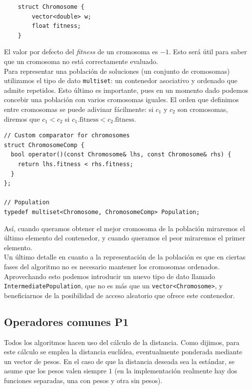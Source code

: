 \documentclass[12pt]{article}
\begin{document}
\begin{verbatim}
	struct Chromosome {
	    vector<double> w;
	    float fitness;
	}
\end{verbatim}

El valor por defecto del \textit{fitness} de un cromosoma es $-1$. Esto será útil para saber que un cromosoma no está correctamente evaluado.\\

Para representar una población de soluciones (un conjunto de cromosomas) utilizamos el tipo de dato \verb|multiset|: un contenedor asociativo y ordenado que admite repetidos. Esto último es importante, pues en un momento dado podemos concebir una población con varios cromosomas iguales. El orden que definimos entre cromosomas se puede adivinar fácilmente: si $c_1$ y $c_2$ son cromosomas, diremos que $c_1 < c_2$ si $c_1.\text{fitness} < c_2.\text{fitness}$.

\begin{verbatim}
// Custom comparator for chromosomes
struct ChromosomeComp {
  bool operator()(const Chromosome& lhs, const Chromosome& rhs) {
    return lhs.fitness < rhs.fitness;
  }
};

// Population
typedef multiset<Chromosome, ChromosomeComp> Population;
\end{verbatim}

Así, cuando queramos obtener el mejor cromosoma de la población miraremos el último elemento del contenedor, y cuando queramos el peor miraremos el primer elemento.\\

Un último detalle en cuanto a la representación de la población es que en ciertas fases del algoritmo no es necesario mantener los cromosomas ordenados. Aprovechando esto podemos introducir un nuevo tipo de dato llamado \verb|IntermediatePopulation|, que no es más que un \verb|vector<Chromosome>|, y beneficiarnos de la posibilidad de acceso aleatorio que ofrece este contenedor.

\subsection*{{\color{red}Operadores comunes P1}}

Todos los algoritmos hacen uso del cálculo de la distancia. Como dijimos, para este cálculo se emplea la distancia euclídea, eventualmente ponderada mediante un vector de pesos. En el caso de que la distancia deseada sea la estándar, se asume que los pesos valen siempre $1$ (en la implementación realmente hay dos funciones separadas, una con pesos y otra sin pesos).
\end{document}
